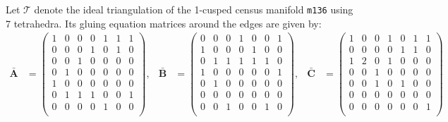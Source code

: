\documentclass[12pt]{amsart}
\theoremstyle{definition}
\def\calT{\mathcal T}
\newcommand{\mb}{\mathbf}
\numberwithin{equation}{section}
\begin{document}
Let $\calT$ denote the ideal triangulation \cite[Ex.7.7]{HRS} of the
1-cusped census manifold {\tt m136} using 7 tetrahedra. Its gluing equation
matrices around the edges are given by:
{\tiny
\begin{align*}
\bar{\mb A} &=\left(
\begin{array}{ccccccc}
 1 & 0 & 0 & 0 & 1 & 1 & 1 \\
 0 & 0 & 0 & 1 & 0 & 1 & 0 \\
 0 & 0 & 1 & 0 & 0 & 0 & 0 \\
 0 & 1 & 0 & 0 & 0 & 0 & 0 \\
 1 & 0 & 0 & 0 & 0 & 0 & 0 \\
 0 & 1 & 1 & 1 & 0 & 0 & 1 \\
 0 & 0 & 0 & 0 & 1 & 0 & 0 \\
\end{array}
\right), &
\bar{\mb B} &=
\left(
\begin{array}{ccccccc}
 0 & 0 & 0 & 1 & 0 & 0 & 1 \\
 1 & 0 & 0 & 0 & 1 & 0 & 0 \\
 0 & 1 & 1 & 1 & 1 & 1 & 0 \\
 1 & 0 & 0 & 0 & 0 & 0 & 1 \\
 0 & 1 & 0 & 0 & 0 & 0 & 0 \\
 0 & 0 & 0 & 0 & 0 & 0 & 0 \\
 0 & 0 & 1 & 0 & 0 & 1 & 0 \\
\end{array}
\right), &
\bar{\mb C}&=
\left(
\begin{array}{ccccccc}
 1 & 0 & 0 & 1 & 0 & 1 & 1 \\
 0 & 0 & 0 & 0 & 1 & 1 & 0 \\
 1 & 2 & 0 & 1 & 0 & 0 & 0 \\
 0 & 0 & 1 & 0 & 0 & 0 & 0 \\
 0 & 0 & 1 & 0 & 1 & 0 & 0 \\
 0 & 0 & 0 & 0 & 0 & 0 & 0 \\
 0 & 0 & 0 & 0 & 0 & 0 & 1 \\
\end{array}
\right)
\end{align*}
}
\end{document}
